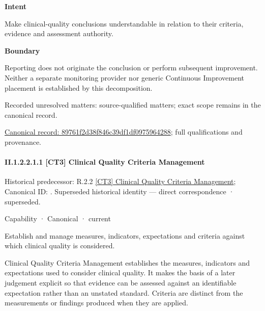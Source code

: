 \textbf{Intent}



Make clinical-quality conclusions understandable in relation to their criteria, evidence and assessment authority.



\textbf{Boundary}



Reporting does not originate the conclusion or perform subsequent improvement. Neither a separate monitoring provider nor generic Continuous Improvement placement is established by this decomposition.


{\small Recorded unresolved matters: source-qualified matters; exact scope remains in the canonical record.}\par
{\footnotesize \href{../../../../../../../continuum/strategy/capability/89761f2d38f846c39df1df0975964288.md}{Canonical record: 89761f2d38f846c39df1df0975964288}; full qualifications and provenance.}\par
\paragraph*{II.1.2.2.1.1 [CT3] Clinical Quality Criteria Management}
\label{navigation:II.1.2.2.1.1}

{\small Historical predecessor: R.2.2 \hyperref[element:7a51321b00464016920976b269981edd]{[CT3] Clinical Quality Criteria Management}; Canonical ID: \texttt{}. Superseded historical identity — direct correspondence · superseded.}\par
\label{element:1f48527a9a7c4382a7f8a660ccb9f29f}
{\small Capability · Canonical · current}\par

Establish and manage measures, indicators, expectations and criteria against which clinical quality is considered.



Clinical Quality Criteria Management establishes the measures, indicators and expectations used to consider clinical quality. It makes the basis of a later judgement explicit so that evidence can be assessed against an identifiable expectation rather than an unstated standard. Criteria are distinct from the measurements or findings produced when they are applied.



